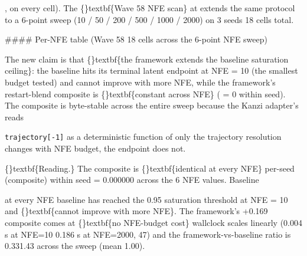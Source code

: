 \documentclass{article}
\begin{document}
,  on every cell). The \{\}textbf\{Wave 58 NFE scan\} at  extends the same protocol to a 6-point sweep (10 / 50 / 200 / 500 / 1000 / 2000) on 3 seeds  18 cells total.

\#\#\#\# Per-NFE table (Wave 58  18 cells across the 6-point NFE sweep)

The new claim is that \{\}textbf\{the framework extends the baseline saturation ceiling\}: the baseline hits its terminal latent endpoint at NFE = 10 (the smallest budget tested) and cannot improve with more NFE, while the framework's restart-blend composite is \{\}textbf\{constant across NFE\} ( = 0 within seed). The composite is byte-stable across the entire sweep because the Kanzi adapter's  reads

\texttt{trajectory[-1]} as a deterministic function of   only the trajectory resolution  changes with NFE budget, the endpoint does not.

\begin{table}[ht]
\centering
\small
{}%
\end{table}

\{\}textbf\{Reading.\} The composite is \{\}textbf\{identical at every NFE\}  per-seed (composite) within seed = 0.000000 across the 6 NFE values. Baseline

 at every NFE  baseline has reached the 0.95 saturation threshold at NFE = 10 and \{\}textbf\{cannot improve with more NFE\}. The framework's +0.169 composite comes at \{\}textbf\{no NFE-budget cost\}  wallclock scales linearly (0.004 s at NFE=10  0.186 s at NFE=2000,  47) and the framework-vs-baseline ratio is 0.331.43 across the sweep (mean  1.00).
\end{document}
